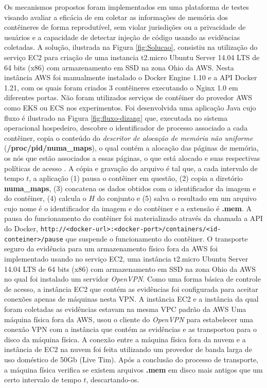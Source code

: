 %
Os mecanismos propostos foram implementados em uma plataforma de testes visando avaliar a eficácia de \fancyname em coletar as informações de memória dos contêineres de forma reprodutível, sem violar jurisdições ou a privacidade de usuários e a capacidade de detectar injeção de código usando as evidências coletadas.
%
A solução, ilustrada na Figura \ref{fig:Solucao}, consistiu na utilização do serviço EC2 para criação de uma instancia t2.micro Ubuntu Server 14.04 LTS de 64 bits (x86) com armazenamento em SSD na zona Ohio da AWS. 
%
Nesta instância AWS foi manualmente instalado o Docker Engine 1.10 e a API Docker 1.21, com os quais foram criados 3 contêineres executando o Nginx 1.0 em diferentes portas. 
%
Não foram utilizados serviços de contêiner do provedor AWS como EKS ou ECS nos experimentos.
%
Foi desenvolvida uma aplicação Java cujo fluxo é ilustrado na Figura \ref{fig:fluxo-dizang} que, executada no sistema operacional hospedeiro, descobre o identificador de processo associado a cada contêiner, copia o conteúdo do \textit{descritor de alocação de memória não uniforme} (\textbf{/proc/pid/numa\_maps}), o qual contém a alocação das páginas de memória, os nós que estão associados a essas páginas, o que está alocado e suas respectivas políticas de acesso \cite{UnixManPagesNumaMaps}.
%
A cópia e gravação do arquivo é tal que, a cada intervalo de tempo $t$, a aplicação (1) pausa o contêiner em questão, (2) copia a diretório \textbf{numa\_maps}, (3)  concatena os dados obtidos com o identificador da imagem e do contêiner, (4) calcula o $H$ do conjunto e (5) salva o resultado em um arquivo cujo nome é o identificador da imagem e do contêiner e a extensão é \textbf{.mem}. 
%
A pausa do funcionamento do contêiner foi materializado através da chamada a API do Docker, \texttt{http://<docker-url>:<docker-port>/containers/<id-conteiner>/pause} que suspende o funcionamento do contêiner.
%
O transporte seguro da evidência para um armazenamento físico fora da AWS foi implementado usando no serviço EC2, uma instância t2.micro Ubuntu Server 14.04 LTS de 64 bits (x86) com armazenamento em SSD na zona Ohio da AWS no qual foi instalado um servidor \textit{OpenVPN}.
%
Como uma forma básica de controle de acesso, a instância EC2 que contém as evidências foi configurada para aceitar conexões apenas de máquinas nesta VPN.
%
A instância EC2 e a instância da qual foram coletadas as evidências estavam na mesma VPC padrão da AWS
%
Uma máquina física fora da AWS, usou o cliente do \textit{OpenVPN} para estabelecer uma conexão VPN com a instância que contém as evidências e as transportou para o disco da máquina física.
%
A conexão entre a máquina física fora da nuvem e a instância de EC2 na nuvem foi feita utilizando um provedor de banda larga de uso doméstico de 50Gb (Live Tim).
%
Após a conclusão do processo de transporte, a máquina física verifica se existem arquivos \textbf{.mem} em disco mais antigos que um certo intervalo de tempo $t$, descartando-os.
%

